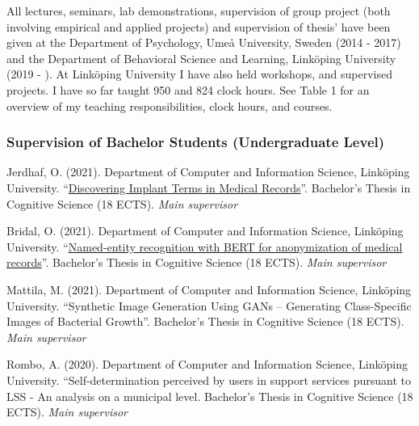 \documentclass[]{article}
\begin{document}
All lectures, seminars, lab demonstrations, supervision of group project
(both involving empirical and applied projects) and supervision of
thesis' have been given at the Department of Psychology, Umeå
University, Sweden (2014 - 2017) and the Department of Behavioral
Science and Learning, Linköping University (2019 - ). At Linköping
University I have also held workshops, and supervised projects. I have
so far taught 950 and 824 clock hours. See Table 1 for an overview of my
teaching responsibilities, clock hours, and courses.

\hypertarget{supervision-of-bachelor-students-undergraduate-level}{%
\subsubsection{Supervision of Bachelor Students (Undergraduate
Level)}\label{supervision-of-bachelor-students-undergraduate-level}}

Jerdhaf, O. (2021). Department of Computer and Information Science,
Linköping University.
``\href{http://liu.diva-portal.org/smash/record.jsf?dswid=-6296\&pid=diva2\%3A1621364\&c=1\&searchType=SIMPLE\&language=sv\&query=Jerdhaf\&af=\%5B\%5D\&aq=\%5B\%5B\%5D\%5D\&aq2=\%5B\%5B\%5D\%5D\&aqe=\%5B\%5D\&noOfRows=50\&sortOrder=author_sort_asc\&sortOrder2=title_sort_asc\&onlyFullText=false\&sf=undergraduate}{Discovering
Implant Terms in Medical Records}''. Bachelor's Thesis in Cognitive
Science (18 ECTS). \emph{Main supervisor}

Bridal, O. (2021). Department of Computer and Information Science,
Linköping University.
``\href{http://liu.diva-portal.org/smash/record.jsf?dswid=-6296\&faces-redirect=true\&language=en\&searchType=SIMPLE\&query=Marsja\&af=\%5B\%5D\&aq=\%5B\%5B\%5D\%5D\&aq2=\%5B\%5B\%5D\%5D\&aqe=\%5B\%5D\&pid=diva2\%3A1566701\&noOfRows=50\&sortOrder=author_sort_asc\&sortOrder2=title_sort_asc\&onlyFullText=false\&sf=undergraduate}{Named-entity
recognition with BERT for anonymization of medical records}''.
Bachelor's Thesis in Cognitive Science (18 ECTS). \emph{Main supervisor}

Mattila, M. (2021). Department of Computer and Information Science,
Linköping University. ``Synthetic Image Generation Using GANs --
Generating Class-Specific Images of Bacterial Growth''. Bachelor's
Thesis in Cognitive Science (18 ECTS). \emph{Main supervisor}

Rombo, A. (2020). Department of Computer and Information Science,
Linköping University. ``Self-determination perceived by users in support
services pursuant to LSS - An analysis on a municipal level. Bachelor's
Thesis in Cognitive Science (18 ECTS). \emph{Main supervisor}
\end{document}
